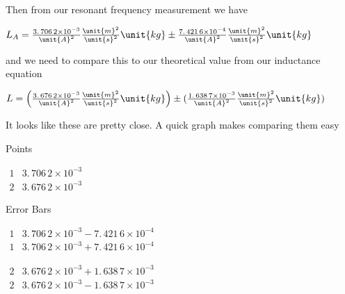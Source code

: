 \documentclass{sebase}
\begin{document}
Then from our resonant frequency measurement we have

$L_{A}=\allowbreak \allowbreak \frac{3.\,\allowbreak 706\,2\times 10^{-3}}{%
\unit{A}^{2}}\frac{\unit{m}^{2}}{\unit{s}^{2}}\unit{kg}\pm \frac{%
7.\,\allowbreak 421\,6\times 10^{-4}}{\unit{A}^{2}}\frac{\unit{m}^{2}}{\unit{%
s}^{2}}\unit{kg}$ 

and we need to compare this to our theoretical value from our inductance
equation

$L=\left( \allowbreak \frac{3.\,\allowbreak 676\,2\times 10^{-3}}{\unit{A}%
^{2}}\frac{\unit{m}^{2}}{\unit{s}^{2}}\unit{kg}\right) \pm (\frac{%
1.\,\allowbreak 638\,7\times 10^{-3}}{\unit{A}^{2}}\frac{\unit{m}^{2}}{\unit{%
s}^{2}}\unit{kg})$ 

It looks like these are pretty close. A quick graph makes comparing them easy

Points

$%
\begin{array}{cc}
1 & 3.\,\allowbreak 706\,2\times 10^{-3} \\ 
2 & 3.\,\allowbreak 676\,2\times 10^{-3}%
\end{array}%
$

Error Bars

$%
\begin{array}{cc}
1 & 3.\,\allowbreak 706\,2\times 10^{-3}-7.\,\allowbreak 421\,6\times 10^{-4}
\\ 
1 & 3.\,\allowbreak 706\,2\times 10^{-3}+7.\,\allowbreak 421\,6\times 10^{-4}%
\end{array}%
$

$%
\begin{array}{cc}
2 & 3.\,\allowbreak 676\,2\times 10^{-3}+1.\,\allowbreak 638\,7\times 10^{-3}
\\ 
2 & 3.\,\allowbreak 676\,2\times 10^{-3}-1.\,\allowbreak 638\,7\times 10^{-3}%
\end{array}%
$
\end{document}
